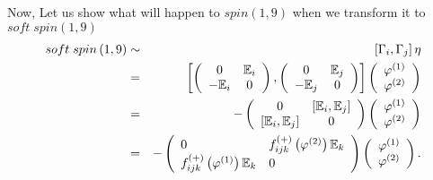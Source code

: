 \documentclass[a4paper,12pt]{book}
\begin{document}
Now, Let us show what will happen to $spin\left( 1,9\right) $ when we
transform it to $soft\;spin\left( 1,9\right) $ 
\begin{eqnarray}
soft\;spin\left( 1,9\right) &\sim &\left[ \Gamma _{i},\Gamma _{j}\right] \eta
\nonumber \\
&=&\left[ \left( 
\begin{array}{cc}
0 & \Bbb{E}_{i} \\ 
-\Bbb{E}_{i} & 0
\end{array}
\right) ,\left( 
\begin{array}{cc}
0 & \Bbb{E}_{j} \\ 
-\Bbb{E}_{j} & 0
\end{array}
\right) \right] \left( 
\begin{array}{l}
\varphi ^{\left( 1\right) } \\ 
\varphi ^{\left( 2\right) }
\end{array}
\right)  \nonumber \\
&=&-\left( 
\begin{array}{cc}
0 & \left[ \Bbb{E}_{i},\Bbb{E}_{j}\right] \\ 
\left[ \Bbb{E}_{i},\Bbb{E}_{j}\right] & 0
\end{array}
\right) \left( 
\begin{array}{l}
\varphi ^{\left( 1\right) } \\ 
\varphi ^{\left( 2\right) }
\end{array}
\right)  \nonumber \\
&=&-\left( 
\begin{array}{ll}
0 & f_{ijk}^{\left( +\right) }\left( \varphi ^{\left( 2\right) }\right) \Bbb{%
E}_{k} \\ 
f_{ijk}^{\left( +\right) }\left( \varphi ^{\left( 1\right) }\right) \Bbb{E}%
_{k} & 0
\end{array}
\right) \left( 
\begin{array}{l}
\varphi ^{\left( 1\right) } \\ 
\varphi ^{\left( 2\right) }
\end{array}
\right) .  \nonumber \\
&&
\end{eqnarray}
\end{document}
